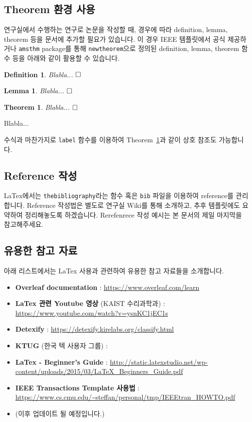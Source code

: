 \documentclass[journal]{IEEEtran}
\newtheorem{theorem}{Theorem}    %
\newtheorem{definition}{Definition} %
\newtheorem{lemma}{Lemma}    %
\begin{document}
\subsection{Theorem 환경 사용}

연구실에서 수행하는 연구로 논문을 작성할 때, 경우에 따라 definition, lemma, theorem 등을 문서에 추가할 필요가 있습니다. 
이 경우 IEEE 템플릿에서 공식 제공하거나 {\tt amsthm} package를 통해 {\tt newtheorem}으로 정의된 definition, lemma, theorem 함수 등을 아래와 같이 활용할 수 있습니다. 

\begin{definition}
    Blabla... $\hfill\square$
\end{definition}

\begin{lemma}
    Blabla... $\hfill\square$
\end{lemma}

\begin{theorem}\label{thm:Dummy}
Blabla... $\hfill\square$
\end{theorem}
\begin{IEEEproof}
    Blabla...
\end{IEEEproof}

수식과 마찬가지로 {\tt label} 함수를 이용하여 Theorem~\ref{thm:Dummy}과 같이 상호 참조도 가능합니다.

\subsection{Reference 작성}

LaTex에서는 {\tt thebibliography}라는 함수 혹은 {\tt bib} 파일을 이용하여 reference를 관리합니다. 
Reference 작성법은 별도로 연구실 Wiki를 통해 소개하고, 추후 템플릿에도 요약하여 정리해놓도록 하겠습니다. 
Rerefenrece 작성 예시는 본 문서의 제일 마지막을 참고해주세요. 

\subsection{유용한 참고 자료}

아래 리스트에서는 LaTex 사용과 관련하여 유용한 참고 자료들을 소개합니다. 
\begin{itemize}
\item {\bf Overleaf documentation} : \url{https://www.overleaf.com/learn}
\item {\bf LaTex 관련 Youtube 영상} (KAIST 수리과학과) : {\url{https://www.youtube.com/watch?v=ysnKC1jEC1s}}
\item {\bf Detexify} : \url{https://detexify.kirelabs.org/classify.html}
\item {\bf KTUG} (한국 텍 사용자 그룹) : 
\item {\bf LaTex - Beginner's Guide} : {\url{http://static.latexstudio.net/wp-content/uploads/2015/03/LaTeX_Beginners_Guide.pdf}}
\item {\bf IEEE Transactions Template 사용법 }: \url{https://www.cs.cmu.edu/~steffan/personal/tmp/IEEEtran_HOWTO.pdf}
\item (이후 업데이트 될 예정입니다.)
\end{itemize}
\end{document}
